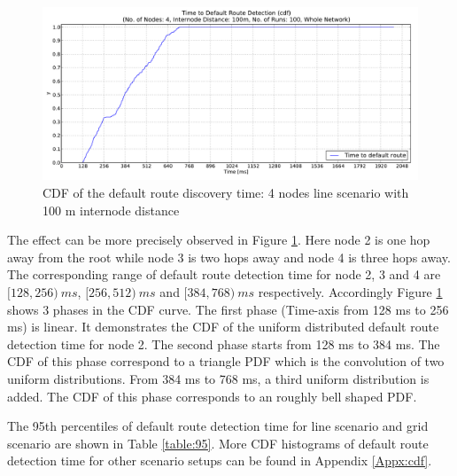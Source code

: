 \begin{figure}[htbp]
  \begin{center}
    \leavevmode
      \includegraphics[scale=0.38]
      {Pics/results/4/MRHOF/line/dist100_montecarlo_cdf_hist.pdf}
   \caption{CDF of the default route discovery time: 4 nodes line scenario with 100 m internode distance}
    \label{fig:dist100_montecarlo_cdf_hist}
  \end{center}
\end{figure}

The effect can be more precisely observed in Figure \ref{fig:dist100_montecarlo_cdf_hist}. Here node 2 is one hop away from the root while node 3 is two hops away and node 4 is three hops away. The corresponding range of default route detection time for node 2, 3 and 4 are $[128, 256)\:ms$, $[256, 512)\:ms$ and $[384, 768)\:ms$ respectively. Accordingly Figure \ref{fig:dist100_montecarlo_cdf_hist} shows 3 phases in the CDF curve. The first phase (Time-axis from 128 ms to 256 ms) is linear. It demonstrates the CDF of the uniform distributed default route detection time for node 2. The second phase starts from 128 ms to 384 ms. The CDF of this phase correspond to a triangle PDF which is the convolution of two uniform distributions. From 384 ms to 768 ms, a third uniform distribution is added. The CDF of this phase corresponds to an roughly bell shaped PDF.
\newline

The 95th percentiles of default route detection time for line scenario and grid scenario are shown in Table \ref{table:95}. More CDF histograms of default route detection time for other scenario setups can be found in Appendix \ref{Appx:cdf}. 

